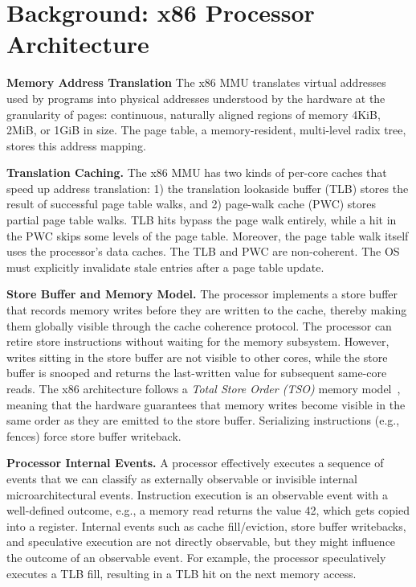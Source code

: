 \section{Background: x86 Processor Architecture}\label{sec:background}

%
%

\noindent\textbf{Memory Address Translation}
The x86 MMU translates virtual addresses used by programs into physical addresses understood by the hardware at the granularity of pages: continuous, naturally aligned regions of memory 4KiB, 2MiB, or 1GiB in size.
The page table, a memory-resident, multi-level radix tree, stores this address mapping.

\noindent\textbf{Translation Caching.}
The x86 MMU has two kinds of per-core caches that speed up address translation: 
1) the translation lookaside buffer (TLB) stores the result of successful page table walks, and 
2) page-walk cache (PWC) stores partial page table walks. 
TLB hits bypass the page walk entirely, while a hit in the PWC skips some levels of the page table.
Moreover, the page table walk itself uses the processor's data caches.
The TLB and PWC are non-coherent. The OS must explicitly invalidate stale entries after a page table update.


\noindent\textbf{Store Buffer and Memory Model.}
The processor implements a store buffer that records memory writes before they are written to the cache, thereby making them globally visible through the cache coherence protocol. 
The processor can retire store instructions without waiting for the memory subsystem.
However, writes sitting in the store buffer are not visible to other cores, while the store buffer is snooped and returns the last-written value for subsequent same-core reads.
%
The x86 architecture follows a \emph{Total Store Order (TSO)} memory model~\cite{owens2009x86tso, sewell2010x86tso}, meaning that the hardware guarantees that memory writes become visible in the same order as they are emitted to the store buffer.
%
Serializing instructions (e.g., fences) force store buffer writeback.


\noindent\textbf{Processor Internal Events.}
A processor effectively executes a sequence of events that we can classify as externally observable or invisible internal microarchitectural events.
Instruction execution is an observable event with a well-defined outcome, e.g., a memory read returns the value 42, which gets copied into a register.
Internal events such as cache fill/eviction, store buffer writebacks, and speculative execution are not directly observable, but they might influence the outcome of an observable event. For example, the processor speculatively executes a TLB fill, resulting in a TLB hit on the next memory access. 